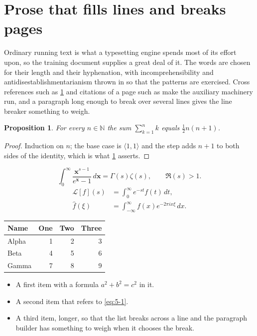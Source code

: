 \documentclass[11pt,a4paper]{report}
\theoremstyle{plain}
\newtheorem{proposition}{Proposition}[chapter]
\newcommand{\vecn}[1]{\mathbf{#1}}
\newcommand{\pairs}[2]{\langle #1,#2\rangle}
\begin{document}
\section{Prose that fills lines and breaks pages}
\label{sec:prose5-1}
Ordinary running text is what a typesetting engine spends most of its effort
upon, so the training document supplies a great deal of it. The words are
chosen for their length and their hyphenation, with incomprehensibility and
antidisestablishmentarianism thrown in so that the patterns are exercised.
Cross references such as \cref{sec:prose5-1} and citations of a page such
as \pageref{sec:prose5-1} make the auxiliary machinery run, and a
paragraph long enough to break over several lines gives the line breaker
something to weigh.
\begin{proposition}\label{prop:5-1}
For every $n\in\mathbb{N}$ the sum $\sum_{k=1}^{n}k$ equals
$\tfrac{1}{2}n(n+1)$.
\end{proposition}
\begin{proof}
Induction on $n$; the base case is $\pairs{1}{1}$ and the step adds $n+1$ to
both sides of the identity, which is what \cref{prop:5-1} asserts.
\end{proof}
\begin{equation}\label{eq:5-1}
  \int_{0}^{\infty}\frac{\vecn{x}^{s-1}}{e^{\vecn{x}}-1}\,d\vecn{x}
    = \Gamma(s)\zeta(s),\qquad \Re(s)>1 .
\end{equation}
\begin{align}
  \mathcal{L}[f](s) &= \int_{0}^{\infty} e^{-st} f(t)\,dt, \\
  \widehat{f}(\xi)  &= \int_{-\infty}^{\infty} f(x) e^{-2\pi i x\xi}\,dx .
\end{align}
\par\noindent\begin{center}
\begin{tabular}{lrrr}
\hline
Name & One & Two & Three \\
\hline
Alpha & 1 & 2 & 3 \\
Beta & 4 & 5 & 6 \\
Gamma & 7 & 8 & 9 \\
\hline
\end{tabular}
\end{center}
\begin{itemize}
  \item A first item with a formula $a^2+b^2=c^2$ in it.
  \item A second item that refers to \eqref{eq:5-1}.
  \item A third item, longer, so that the list breaks across a line and the
    paragraph builder has something to weigh when it chooses the break.
\end{itemize}
\end{document}
